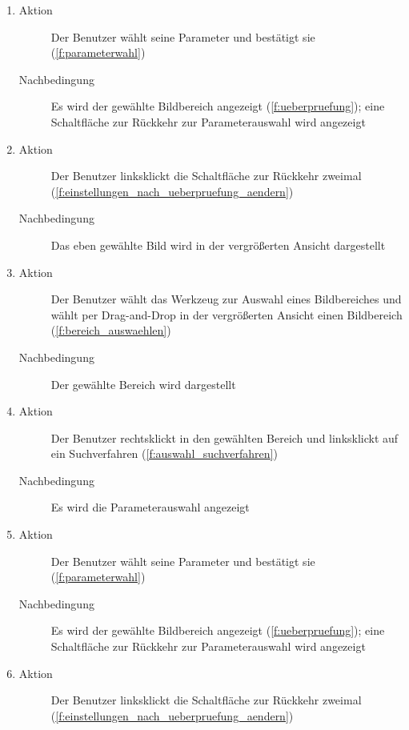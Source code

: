 \begin{enumerate} [label=\bfseries /TS \arabic*0/, leftmargin=*]
\begin{enumerate}[leftmargin=0pt]
		\item
		\begin{description}
			\item[Aktion] Der Benutzer wählt seine Parameter und bestätigt sie (\ref{f:parameterwahl})
			\item[Nachbedingung] Es wird der gewählte  Bildbereich angezeigt (\ref{f:ueberpruefung}); eine Schaltfläche zur Rückkehr zur Parameterauswahl wird angezeigt
		\end{description}
		\item
		\begin{description}
			\item[Aktion] Der Benutzer linksklickt die Schaltfläche zur Rückkehr zweimal (\ref{f:einstellungen_nach_ueberpruefung_aendern})
			\item[Nachbedingung] Das eben gewählte Bild wird in der vergrößerten Ansicht dargestellt
		\end{description}
		\item
		\begin{description}
			\item[Aktion] Der Benutzer wählt das Werkzeug zur Auswahl eines Bildbereiches und wählt per Drag-and-Drop in der vergrößerten Ansicht einen Bildbereich (\ref{f:bereich_auswaehlen})
			\item[Nachbedingung] Der gewählte Bereich wird dargestellt
		\end{description}
		\item
		\begin{description}
			\item[Aktion] Der Benutzer rechtsklickt in den gewählten Bereich und linksklickt auf ein \gls{Suchverfahren} (\ref{f:auswahl_suchverfahren})
			\item[Nachbedingung] Es wird die Parameterauswahl angezeigt
		\end{description}
		\item
		\begin{description}
			\item[Aktion] Der Benutzer wählt seine Parameter und bestätigt sie (\ref{f:parameterwahl})
			\item[Nachbedingung] Es wird der gewählte Bildbereich angezeigt (\ref{f:ueberpruefung}); eine Schaltfläche zur Rückkehr zur Parameterauswahl wird angezeigt
		\end{description}
		\item
		\begin{description}
			\item[Aktion] Der Benutzer linksklickt die Schaltfläche zur Rückkehr zweimal (\ref{f:einstellungen_nach_ueberpruefung_aendern})

\end{description}
\end{enumerate}
\end{enumerate}
